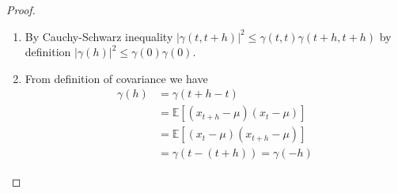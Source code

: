 \documentclass[10pt]{article}
\theoremstyle{remark}
\theoremstyle{plain}
\numberwithin{equation}{section}
\renewcommand{\leq}{\leqslant}
\begin{document}
\begin{proof}
	\begin{enumerate}
		\item By Cauchy-Schwarz inequality $|\gamma (t, t+h)|^2 \leq \gamma(t,t) \gamma(t+h,t+h)$ by definition $|\gamma(h)|^2 \leq \gamma(0) \gamma(0)$.
		
		\item From definition of covariance we have
		\begin{align*} 
			\gamma(h) &= \gamma(t+h-t)\\
			& = \mathds{E}\left[(x_{t+h}-\mu)(x_t - \mu)\right]\\
			& = \mathds{E}\left[(x_t - \mu)(x_{t+h}-\mu)\right]\\
			& = \gamma(t-(t+h)) = \gamma(-h)
		\end{align*}
	\end{enumerate}
\end{proof}
\end{document}
